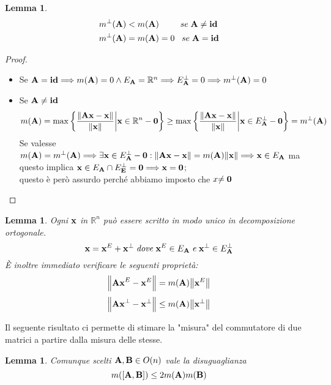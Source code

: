 \documentclass[a4paper,11pt,openright,twoside	]{book}
\newtheorem{lemma}[theorem]{Lemma}
\begin{document}
\begin{lemma}

\begin{equation}
\label{diseq:ma}
\begin{split}
m^{\perp}(\vb{A})  & < m(\vb{A}) \; \; \; \; \; \; \; \; \; se \; \vb{A \neq id}  \\
 m^{\perp}(\vb{A})  & = m(\vb{A}) = 0 \; \; \;  se \; \vb{A = id}
\end{split}
\end{equation}

\end{lemma}

\begin{proof}
\begin{itemize}
\item Se $\vb{A = id} \Longrightarrow m(\vb{A}) = 0 \land E_{\vb{A}} = \mathbb{R}^n \Longrightarrow E^{\perp}_{\vb{A}} = {0} \Longrightarrow m^{\perp}(\vb{A}) = 0$

\item Se $\vb{A \neq id}$ 
\[ m(\vb{A}) = \max \bigg\{ \frac{\norm{\vb{Ax-x}}}{\norm{\vb{x}}} \bigg|  \vb{x} \in \mathbb{R}^{n}-\vb{0} \bigg\} 
\geq \max \bigg\{ \frac{\norm{\vb{Ax-x}}}{\norm{\vb{x}}} \bigg|  \vb{x} \in E^{\perp}_{\vb{A}} - \vb{0} \bigg\} =  m^{\perp}(\vb{A}) \]
Se valesse $m(\vb{A}) = m^{\perp}(\vb{A}) \Longrightarrow \exists \vb{x} \in E^{\perp}_{\vb{A}} - \vb{0} : \norm{\vb{Ax-x}} = m(\vb{A})\norm{\vb{x}} \Longrightarrow \vb{x} \in E_{\vb{A}}$  ma questo implica $\vb{x} \in E_{\vb{A}} \cap E^{\perp}_{\vb{E}} = {\vb{0}} \Longrightarrow \vb{x = 0} $;  \\
questo è però assurdo perché abbiamo imposto che $x\vb{ \neq 0}$ 
\end{itemize}
\end{proof}

\begin{lemma}
Ogni $\vb{x}$ in $\mathbb{R}^n $ può essere scritto in modo unico in decomposizione ortogonale. 
\[ \vb{x} = \vb{x}^E + \vb{x}^{\perp} \; \mathit{dove} \; \vb{x}^E \in E_{\vb{A}} \; \mathit{e} \; \vb{x}^{\perp} \in E^{\perp}_{\vb{A}} \]
\`E inoltre immediato verificare le seguenti proprietà:
\[ \norm{\vb{Ax}^E - \vb{x}^E }= m(\vb{A})\norm{\vb{x}^E} \] \[\norm{\vb{Ax}^{\perp} - \vb{x}^{\perp}} \leq m(\vb{A}) \norm{\vb{x}^{\perp}} \]
\end{lemma}

Il seguente risultato ci permette di stimare la "misura" del commutatore di due matrici a partire dalla misura delle stesse. 
\begin{lemma}
\label{lemma:2}
 Comunque scelti $\vb{ A, B} \in O(n)$ vale la disuguaglianza 
 \[ m([\vb{A,B}]) \leq 2m(\vb{A})m(\vb{B}) \]
\end{lemma}
\end{document}
